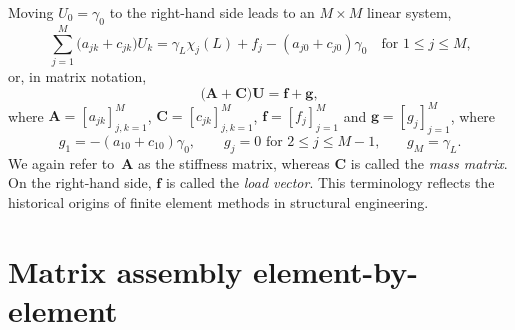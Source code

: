 Moving $U_0=\gamma_0$ to the right-hand side leads to an $M\times M$ linear 
system,
\[
\sum_{j=1}^M\bigl(a_{jk}+c_{jk})U_k
    =\gamma_L\chi_j(L)+f_j-(a_{j0}+c_{j0})\gamma_0
    \quad\text{for $1\le j\le M$,}
\]
or, in matrix notation,
\begin{equation}\label{eq: self-adjoint mixed equations}
\bigl(\boldsymbol{A}+\boldsymbol{C}\bigr)\boldsymbol{U}
    =\boldsymbol{f}+\boldsymbol{g},
\end{equation}
where $\boldsymbol{A}=[a_{jk}]_{j,k=1}^M$, $\boldsymbol{C}=[c_{jk}]_{j,k=1}^M$,
$\boldsymbol{f}=[f_j]_{j=1}^M$ and $\boldsymbol{g}=[g_j]_{j=1}^M$, where
\[
g_1=-(a_{10}+c_{10})\gamma_0,\qquad
\text{$g_j=0$ for $2\le j\le M-1$,}\qquad
g_M=\gamma_L.
\]
We again refer to~$\boldsymbol{A}$ as the stiffness matrix, whereas 
$\boldsymbol{C}$ is called the \emph{mass matrix}.  On the right-hand side, 
$\boldsymbol{f}$ is called the \emph{load vector}.  This terminology reflects 
the historical origins of finite element methods in structural engineering.

\section{Matrix assembly element-by-element}

